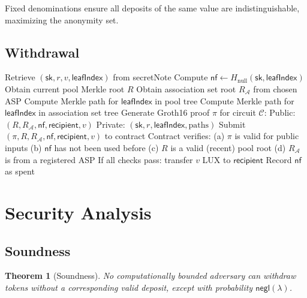 \documentclass[11pt,a4paper]{article}
\newtheorem{theorem}{Theorem}
\begin{document}
Fixed denominations ensure all deposits of the same value are indistinguishable, maximizing the anonymity set.

\subsection{Withdrawal}

\begin{algorithm}[H]
\caption{Privacy Pool Withdrawal}
\label{alg:withdraw}
\begin{algorithmic}[1]
    \State Retrieve $(\mathsf{sk}, r, v, \mathsf{leafIndex})$ from secretNote
    \State Compute $\mathsf{nf} \gets H_{\text{null}}(\mathsf{sk}, \mathsf{leafIndex})$
    \State Obtain current pool Merkle root $R$
    \State Obtain association set root $R_{\mathcal{A}}$ from chosen ASP
    \State Compute Merkle path for $\mathsf{leafIndex}$ in pool tree
    \State Compute Merkle path for $\mathsf{leafIndex}$ in association set tree
    \State Generate Groth16 proof $\pi$ for circuit $\mathcal{C}$:
    \State \quad Public: $(R, R_{\mathcal{A}}, \mathsf{nf}, \mathsf{recipient}, v)$
    \State \quad Private: $(\mathsf{sk}, r, \mathsf{leafIndex}, \text{paths})$
    \State Submit $(\pi, R, R_{\mathcal{A}}, \mathsf{nf}, \mathsf{recipient}, v)$ to contract
    \State Contract verifies:
    \State \quad (a) $\pi$ is valid for public inputs
    \State \quad (b) $\mathsf{nf}$ has not been used before
    \State \quad (c) $R$ is a valid (recent) pool root
    \State \quad (d) $R_{\mathcal{A}}$ is from a registered ASP
    \State If all checks pass: transfer $v$ LUX to $\mathsf{recipient}$
    \State Record $\mathsf{nf}$ as spent
\EndProcedure
\end{algorithmic}
\end{algorithm}

\section{Security Analysis}\label{sec:security}

\subsection{Soundness}

\begin{theorem}[Soundness]
No computationally bounded adversary can withdraw tokens without a corresponding valid deposit, except with probability $\mathsf{negl}(\lambda)$.
\end{theorem}
\end{document}
